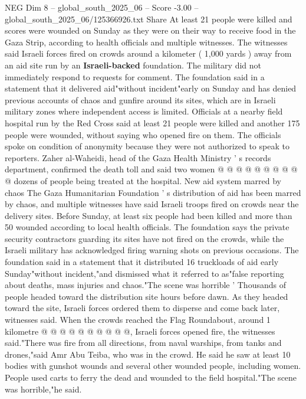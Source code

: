 \begin{textsample}{NEG Dim 8 – global\_south\_2025\_06 – Score -3.00 – global\_south\_2025\_06/125366926.txt}  \label{ex:f8_neg_034}
Share At least 21 people were killed and scores were wounded on Sunday as they were on their way to receive food in the Gaza Strip, according to health officials and multiple witnesses.
The witnesses said Israeli forces fired on crowds around a kilometer ( 1,000 yards ) away from an aid site run by an \textbf{Israeli-backed} foundation.
The military did not immediately respond to requests for comment.
The foundation said in a statement that it delivered aid"without incident"early on Sunday and has denied previous accounts of chaos and gunfire around its sites, which are in Israeli military zones where independent access is limited.
Officials at a nearby field hospital run by the Red Cross said at least 21 people were killed and another 175 people were wounded, without saying who opened fire on them.
The officials spoke on condition of anonymity because they were not authorized to speak to reporters.
Zaher al-Waheidi, head of the Gaza Health Ministry ' s records department, confirmed the death toll and said two women @ @ @ @ @ @ @ @ @ @ dozens of people being treated at the hospital.
New aid system marred by chaos The Gaza Humanitarian Foundation ' s distribution of aid has been marred by chaos, and multiple witnesses have said Israeli troops fired on crowds near the delivery sites.
Before Sunday, at least six people had been killed and more than 50 wounded according to local health officials.
The foundation says the private security contractors guarding its sites have not fired on the crowds, while the Israeli military has acknowledged firing warning shots on previous occasions.
The foundation said in a statement that it distributed 16 truckloads of aid early Sunday"without incident,"and dismissed what it referred to as"false reporting about deaths, mass injuries and chaos."The scene was horrible ' Thousands of people headed toward the distribution site hours before dawn.
As they headed toward the site, Israeli forces ordered them to disperse and come back later, witnesses said.
When the crowds reached the Flag Roundabout, around 1 kilometre @ @ @ @ @ @ @ @ @ @, Israeli forces opened fire, the witnesses said."There was fire from all directions, from naval warships, from tanks and drones,"said Amr Abu Teiba, who was in the crowd.
He said he saw at least 10 bodies with gunshot wounds and several other wounded people, including women.
People used carts to ferry the dead and wounded to the field hospital."The scene was horrible,"he said.

\end{textsample}
